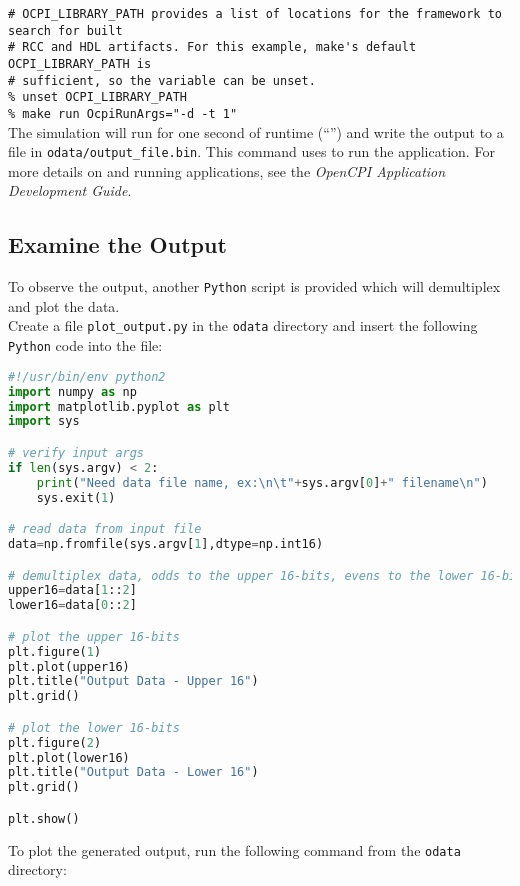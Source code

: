 \forceindent\verb+# OCPI_LIBRARY_PATH provides a list of locations for the framework to search for built+\\
\forceindent\verb+# RCC and HDL artifacts. For this example, make's default OCPI_LIBRARY_PATH is+\\
\forceindent\verb+# sufficient, so the variable can be unset.+\\
\forceindent\verb+% unset OCPI_LIBRARY_PATH+   \\
\forceindent\verb+% make run OcpiRunArgs="-d -t 1"+\\
\bend
The simulation will run for one second of runtime (``'') and write the output to a file in \verb+odata/output_file.bin+.
This  command uses  to run the application. For more details on  and running applications, see the \textit{OpenCPI Application Development Guide}.

\subsection{Examine the Output}
\label{example:output}
To observe the output, another \verb+Python+ script is provided which will demultiplex and plot the data.\\
\bstart
Create a file \verb+plot_output.py+ in the \verb+odata+ directory and insert the following \verb+Python+ code into the file:
\begin{lstlisting}[language=python]
#!/usr/bin/env python2
import numpy as np
import matplotlib.pyplot as plt
import sys

# verify input args
if len(sys.argv) < 2:
    print("Need data file name, ex:\n\t"+sys.argv[0]+" filename\n")
    sys.exit(1)

# read data from input file
data=np.fromfile(sys.argv[1],dtype=np.int16)

# demultiplex data, odds to the upper 16-bits, evens to the lower 16-bits
upper16=data[1::2]
lower16=data[0::2]

# plot the upper 16-bits
plt.figure(1)
plt.plot(upper16)
plt.title("Output Data - Upper 16")
plt.grid()

# plot the lower 16-bits
plt.figure(2)
plt.plot(lower16)
plt.title("Output Data - Lower 16")
plt.grid()

plt.show()
\end{lstlisting}
\bend
\bstart
To plot the generated output, run the following command from the \verb+odata+ directory:\\

